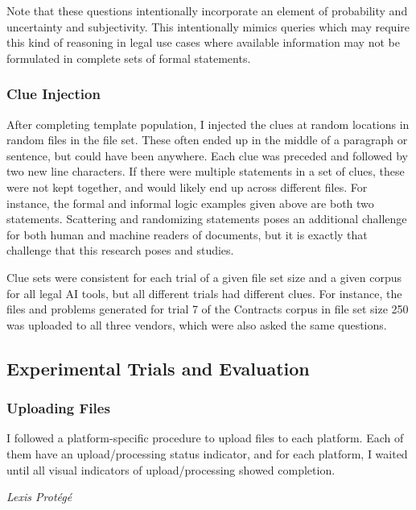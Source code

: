 \documentclass[
]{article}
\begin{document}
Note that these questions intentionally incorporate an element of
probability and uncertainty and subjectivity. This intentionally mimics
queries which may require this kind of reasoning in legal use cases
where available information may not be formulated in complete sets of
formal statements.

\subsubsection{Clue Injection}\label{clue-injection}

After completing template population, I injected the clues at random
locations in random files in the file set. These often ended up in the
middle of a paragraph or sentence, but could have been anywhere. Each
clue was preceded and followed by two new line characters. If there were
multiple statements in a set of clues, these were not kept together, and
would likely end up across different files. For instance, the formal and
informal logic examples given above are both two statements. Scattering
and randomizing statements poses an additional challenge for both human
and machine readers of documents, but it is exactly that challenge that
this research poses and studies.

Clue sets were consistent for each trial of a given file set size and a
given corpus for all legal AI tools, but all different trials had
different clues. For instance, the files and problems generated for
trial 7 of the Contracts corpus in file set size 250 was uploaded to all
three vendors, which were also asked the same questions.

\subsection{Experimental Trials and
Evaluation}\label{experimental-trials-and-evaluation}

\subsubsection{Uploading Files}\label{uploading-files}

I followed a platform-specific procedure to upload files to each
platform. Each of them have an upload/processing status indicator, and
for each platform, I waited until all visual indicators of
upload/processing showed completion.

\emph{Lexis Protégé}
\end{document}
